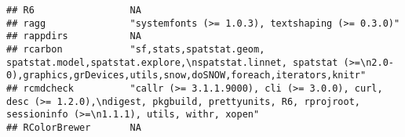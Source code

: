 \documentclass[
]{article}
\begin{document}
\begin{verbatim}
## R6                 NA                                                                                                                                                                                                                                                                                                                                                                                                                                           
## ragg               "systemfonts (>= 1.0.3), textshaping (>= 0.3.0)"                                                                                                                                                                                                                                                                                                                                                                                             
## rappdirs           NA                                                                                                                                                                                                                                                                                                                                                                                                                                           
## rcarbon            "sf,stats,spatstat.geom, spatstat.model,spatstat.explore,\nspatstat.linnet, spatstat (>=\n2.0-0),graphics,grDevices,utils,snow,doSNOW,foreach,iterators,knitr"                                                                                                                                                                                                                                                                               
## rcmdcheck          "callr (>= 3.1.1.9000), cli (>= 3.0.0), curl, desc (>= 1.2.0),\ndigest, pkgbuild, prettyunits, R6, rprojroot, sessioninfo (>=\n1.1.1), utils, withr, xopen"                                                                                                                                                                                                                                                                                  
## RColorBrewer       NA                                                                                                                                                                                                                                                                                                                                                                                                                                           

\end{verbatim}
\end{document}
